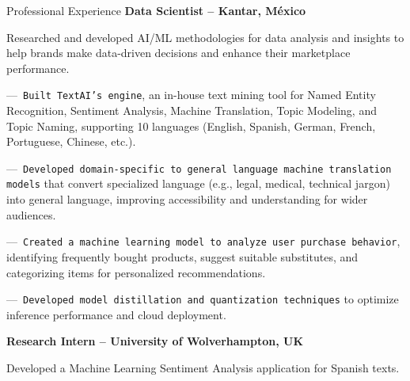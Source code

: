 \begin{rubric}{Professional Experience}
\entry*[06.2018 -- 09.2021]%
	\textbf{Data Scientist -- Kantar, México}
 
Researched and developed AI/ML methodologies for data analysis and insights to help brands make data-driven decisions and enhance their marketplace performance.\par\par
%
---~\texttt{Built TextAI’s engine}, an in-house text mining tool for Named Entity Recognition, Sentiment Analysis, Machine Translation, Topic Modeling, and Topic Naming, supporting 10 languages (English, Spanish, German, French, Portuguese, Chinese, etc.).\par

---~\texttt{Developed domain-specific to general language machine translation models} that convert specialized language (e.g., legal, medical, technical jargon) into general language, improving accessibility and understanding for wider audiences.\par

---~\texttt{Created a machine learning model to analyze user purchase behavior}, identifying frequently bought products, suggest suitable substitutes, and categorizing items for personalized recommendations.\par
---~\texttt{Developed model distillation and quantization techniques} to optimize inference performance and cloud deployment.

%
%
\entry*[02.2017 -- 08.2017]%
	\textbf{Research Intern -- University of Wolverhampton, UK}
 
 Developed a Machine Learning Sentiment Analysis application for Spanish texts.
%
\end{rubric}